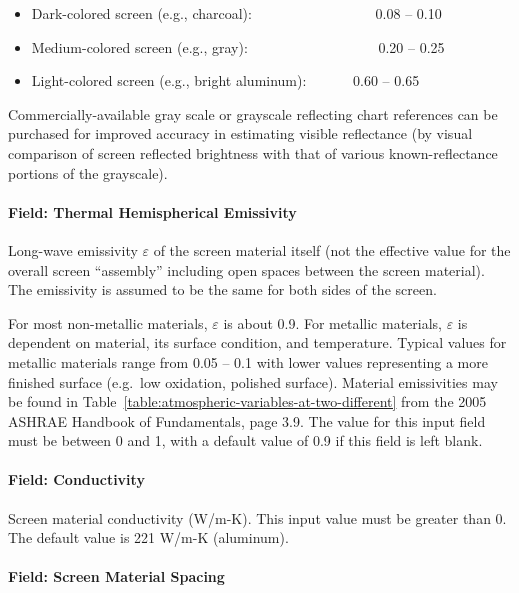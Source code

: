\begin{itemize}
\item
  Dark-colored screen (e.g., charcoal):~~~~~~~~~~~~~~~~~ 0.08 -- 0.10
\item
  Medium-colored screen (e.g., gray):~~~~~~~~~~~~~~~~~~ 0.20 -- 0.25
\item
  Light-colored screen (e.g., bright aluminum):~~~~~~ 0.60 -- 0.65
\end{itemize}

Commercially-available gray scale or grayscale reflecting chart references can be purchased for improved accuracy in estimating visible reflectance (by visual comparison of screen reflected brightness with that of various known-reflectance portions of the grayscale).

\paragraph{Field: Thermal Hemispherical Emissivity}\label{field-thermal-hemispherical-emissivity-1}

Long-wave emissivity \(\varepsilon\) of the screen material itself (not the effective value for the overall screen ``assembly'' including open spaces between the screen material). The emissivity is assumed to be the same for both sides of the screen.

For most non-metallic materials, \(\varepsilon\) is about 0.9. For metallic materials, \(\varepsilon\) is dependent on material, its surface condition, and temperature. Typical values for metallic materials range from 0.05 -- 0.1 with lower values representing a more finished surface (e.g.~low oxidation, polished surface). Material emissivities may be found in Table~\ref{table:atmospheric-variables-at-two-different} from the 2005 ASHRAE Handbook of Fundamentals, page 3.9. The value for this input field must be between 0 and 1, with a default value of 0.9 if this field is left blank.

\paragraph{Field: Conductivity}\label{field-conductivity-5}

Screen material conductivity (W/m-K). This input value must be greater than 0. The default value is 221 W/m-K (aluminum).

\paragraph{Field: Screen Material Spacing}\label{field-screen-material-spacing}

